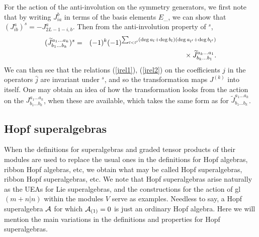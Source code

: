 \documentclass[twocolumn,floats,pra]{revtex4}
\newcommand {\bea}{\begin{eqnarray}}
\newcommand {\eea} {\end{eqnarray}}
\begin{document}
For the action of the anti-involution on the symmetry generators,
we first note that by writing $J_{ia}^b$ in terms of the basis
elements $E_{\ldots}$, we can show that
$(J_{ib}^a)^s=-J_{2L-1-i,b}^a$. Then from the anti-involution
property of $^s$, %
\bea%
(\widetilde{J}^{a_1\ldots a_k}_{b_1\ldots b_k})^s&=&
(-1)^k(-1)^{\sum_{l<l'}({\rm deg}\,a_l+{\rm deg}\,b_l) ({\rm
deg}\,a_{l'}+{\rm deg}\,b_{l'})}\nonumber\\
&&\mbox{}\times \widetilde{J}^{a_k\ldots a_1}_{b_k\ldots b_1}.\eea %
We can then see that the relations (\ref{jrel1}), (\ref{jrel2}) on
the coefficients $j$ in the operators $\widehat{j}$ are invariant
under $^s$, and so the transformation maps $J^{(k)}$ into itself.
One may obtain an idea of how the transformation looks from the
action on the ${J}^{a_1\ldots a_k}_{b_1\ldots b_k}$, when these
are available, which takes the same form as for
$\widetilde{J}^{a_1\ldots a_k}_{b_1\ldots b_k}$.



\subsection{Hopf superalgebras}

When the definitions for superalgebras and graded tensor products
of their modules are used to replace the usual ones \cite{cp,kass}
in the definitions for Hopf algebras, ribbon Hopf algebras, etc,
we obtain what may be called Hopf superalgebras, ribbon Hopf
superalgebras, etc. We note that Hopf superalgebras arise
naturally as the UEAs for Lie superalgebras, and the constructions
for the action of gl$(m+n|n)$ within the modules $V$ serve as
examples. Needless to say, a Hopf superalgebra $\cal A$ for which
${\cal A}_{(1)}=0$ is just an ordinary Hopf algebra. Here we will
mention the main variations in the definitions and properties for
Hopf superalgebras.
\end{document}
